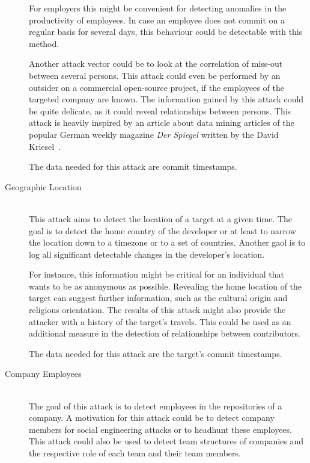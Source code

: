 \begin{description}
        For employers this might be convenient for detecting anomalies in the productivity of employees.
        In case an employee does not commit on a regular basis for several days, this behaviour could be detectable with this method.

        Another attack vector could be to look at the correlation of miss-out between several persons.
        This attack could even be performed by an outsider on a commercial open-source project, if the employees of the targeted company are known.
        The information gained by this attack could be quite delicate, as it could reveal relationships between persons.
        This attack is heavily inspired by an article about data mining articles of the popular German weekly magazine \emph{Der Spiegel} written by the David Kriesel~\cite{article:spiegel-mining}.

        The data needed for this attack are commit timestamps.

    \item[Geographic Location]~\label{attack:geographic-location} \hfill \\
        This attack aims to detect the location of a target at a given time.
        The goal is to detect the home country of the developer or at least to narrow the location down to a timezone or to a set of countries.
        Another gaol is to log all significant detectable changes in the developer's location.

        For instance, this information might be critical for an individual that wants to be as anonymous as possible.
        Revealing the home location of the target can suggest further information, such as the cultural origin and religious orientation.
        The results of this attack might also provide the attacker with a history of the target's travels.
        This could be used as an additional measure in the detection of relationships between contributors.

        The data needed for this attack are the target's commit timestamps.

    \item[Company Employees]~\label{attack:company-employees} \hfill \\
        The goal of this attack is to detect employees in the repositories of a company.
        A motivation for this attack could be to detect company members for social engineering attacks or to headhunt these employees.
        This attack could also be used to detect team structures of companies and the respective role of each team and their team members.


\end{description}
